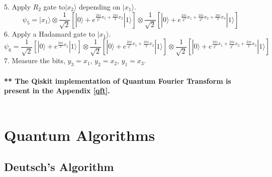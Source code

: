 \documentclass[12pt]{report}
\begin{document}
5. Apply $R_2$ gate to$|x_2\rangle$ depending on $|x_1\rangle$.
\begin{equation}
\psi_5 = |x_1\rangle  \otimes  \frac{1}{\sqrt{2}}\left[|0\rangle + e^{\frac{2\pi i}{2^2}x_1 + \frac{2\pi i}{2}x_2}|1\rangle\right] \otimes \frac{1}{\sqrt{2}}\left[|0\rangle + e^{\frac{2\pi i}{2^3}x_1 + \frac{2\pi i}{2^2}x_2 + \frac{2\pi i}{2}x_3}|1\rangle\right]
\end{equation}
6. Apply a Hadamard gate to $|x_1\rangle$.
\begin{equation}
\psi_6 = \frac{1}{\sqrt{2}}\left[|0\rangle + e^{\frac{2\pi i}{2}x_1}|1\rangle\right]  \otimes  \frac{1}{\sqrt{2}}\left[|0\rangle + e^{\frac{2\pi i}{2^2}x_1 + \frac{2\pi i}{2}x_2}|1\rangle\right] \otimes \frac{1}{\sqrt{2}}\left[|0\rangle + e^{\frac{2\pi i}{2^3}x_1 + \frac{2\pi i}{2^2}x_2 + \frac{2\pi i}{2}x_3}|1\rangle\right]
\end{equation}
7. Measure the bits, $y_3 = x_1$, $y_2 = x_2$, $y_1 = x_3$.\\ \\
\textbf{** The Qiskit implementation of Quantum Fourier Transform is present in the Appendix \ref{qft}.} \\ \\
\chapter{Quantum Algorithms}
\section{Deutsch's Algorithm}
\end{document}

